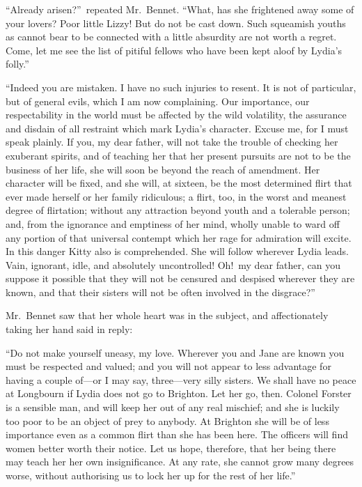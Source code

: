 \documentclass[12pt,english]{book}
\begin{document}
{}``Already arisen?''\ repeated Mr.\ Bennet. {}``What, has she
frightened away some of your lovers? Poor little Lizzy! But do not
be cast down. Such squeamish youths as cannot bear to be connected
with a little absurdity are not worth a regret. Come, let me see the
list of pitiful fellows who have been kept aloof by Lydia's folly.''

{}``Indeed you are mistaken. I have no such injuries to resent. It
is not of particular, but of general evils, which I am now complaining.
Our importance, our respectability in the world must be affected by
the wild volatility, the assurance and disdain of all restraint which
mark Lydia's character. Excuse me, for I must speak plainly. If you,
my dear father, will not take the trouble of checking her exuberant
spirits, and of teaching her that her present pursuits are not to
be the business of her life, she will soon be beyond the reach of
amendment. Her character will be fixed, and she will, at sixteen,
be the most determined flirt that ever made herself or her family
ridiculous; a flirt, too, in the worst and meanest degree of flirtation;
without any attraction beyond youth and a tolerable person; and, from
the ignorance and emptiness of her mind, wholly unable to ward off
any portion of that universal contempt which her rage for admiration
will excite. In this danger Kitty also is comprehended. She will follow
wherever Lydia leads. Vain, ignorant, idle, and absolutely uncontrolled!
Oh!\ my dear father, can you suppose it possible that they will not
be censured and despised wherever they are known, and that their sisters
will not be often involved in the disgrace?''\ 

Mr.\ Bennet saw that her whole heart was in the subject, and affectionately
taking her hand said in reply:

{}``Do not make yourself uneasy, my love. Wherever you and Jane are
known you must be respected and valued; and you will not appear to
less advantage for having a couple of\mbox{---}or I may say, three\mbox{---}very
silly sisters. We shall have no peace at Longbourn if Lydia does not
go to Brighton. Let her go, then. Colonel Forster is a sensible man,
and will keep her out of any real mischief; and she is luckily too
poor to be an object of prey to anybody. At Brighton she will be of
less importance even as a common flirt than she has been here. The
officers will find women better worth their notice. Let us hope, therefore,
that her being there may teach her her own insignificance. At any
rate, she cannot grow many degrees worse, without authorising us to
lock her up for the rest of her life.''
\end{document}
